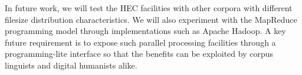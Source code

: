 
\vspace{10pt}

In future work, we will test the HEC facilities with other corpora with different filesize distribution characteristics. We will also experiment with the MapReduce programming model through implementations such as Apache Hadoop. A key future requirement is to expose such parallel processing facilities through a programming-lite interface so that the benefits can be exploited by corpus linguists and digital humanists alike.










% 
% 
% 
% 
% 
% 
% 
% 
